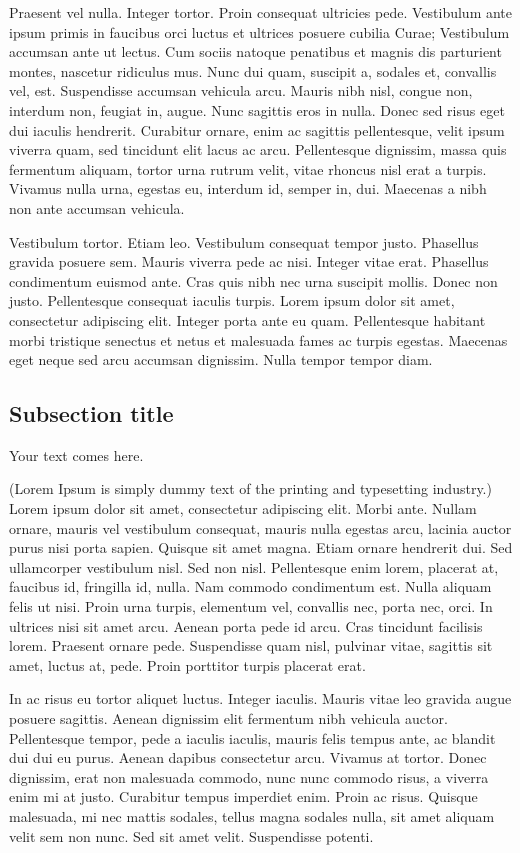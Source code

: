 Praesent vel nulla. Integer tortor. Proin consequat ultricies pede. Vestibulum ante ipsum primis in faucibus orci luctus et ultrices posuere cubilia Curae; Vestibulum accumsan ante ut lectus. Cum sociis natoque penatibus et magnis dis parturient montes, nascetur ridiculus mus. Nunc dui quam, suscipit a, sodales et, convallis vel, est. Suspendisse accumsan vehicula arcu. Mauris nibh nisl, congue non, interdum non, feugiat in, augue. Nunc sagittis eros in nulla. Donec sed risus eget dui iaculis hendrerit. Curabitur ornare, enim ac sagittis pellentesque, velit ipsum viverra quam, sed tincidunt elit lacus ac arcu. Pellentesque dignissim, massa quis fermentum aliquam, tortor urna rutrum velit, vitae rhoncus nisl erat a turpis. Vivamus nulla urna, egestas eu, interdum id, semper in, dui. Maecenas a nibh non ante accumsan vehicula.

Vestibulum tortor. Etiam leo. Vestibulum consequat tempor justo. Phasellus gravida posuere sem. Mauris viverra pede ac nisi. Integer vitae erat. Phasellus condimentum euismod ante. Cras quis nibh nec urna suscipit mollis. Donec non justo. Pellentesque consequat iaculis turpis. Lorem ipsum dolor sit amet, consectetur adipiscing elit. Integer porta ante eu quam. Pellentesque habitant morbi tristique senectus et netus et malesuada fames ac turpis egestas. Maecenas eget neque sed arcu accumsan dignissim. Nulla tempor tempor diam.

\subsection{Subsection title}
\label{sec:2}
Your text comes here.

(Lorem Ipsum is simply dummy text of the printing and typesetting industry.) Lorem ipsum dolor sit amet, consectetur adipiscing elit. Morbi ante. Nullam ornare, mauris vel vestibulum consequat, mauris nulla egestas arcu, lacinia auctor purus nisi porta sapien. Quisque sit amet magna. Etiam ornare hendrerit dui. Sed ullamcorper vestibulum nisl. Sed non nisl. Pellentesque enim lorem, placerat at, faucibus id, fringilla id, nulla. Nam commodo condimentum est. Nulla aliquam felis ut nisi. Proin urna turpis, elementum vel, convallis nec, porta nec, orci. In ultrices nisi sit amet arcu. Aenean porta pede id arcu. Cras tincidunt facilisis lorem. Praesent ornare pede. Suspendisse quam nisl, pulvinar vitae, sagittis sit amet, luctus at, pede. Proin porttitor turpis placerat erat.

In ac risus eu tortor aliquet luctus. Integer iaculis. Mauris vitae leo gravida augue posuere sagittis. Aenean dignissim elit fermentum nibh vehicula auctor. Pellentesque tempor, pede a iaculis iaculis, mauris felis tempus ante, ac blandit dui dui eu purus. Aenean dapibus consectetur arcu. Vivamus at tortor. Donec dignissim, erat non malesuada commodo, nunc nunc commodo risus, a viverra enim mi at justo. Curabitur tempus imperdiet enim. Proin ac risus. Quisque malesuada, mi nec mattis sodales, tellus magna sodales nulla, sit amet aliquam velit sem non nunc. Sed sit amet velit. Suspendisse potenti.

